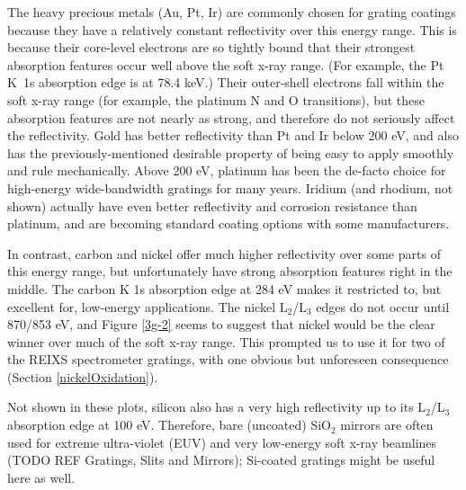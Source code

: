 The heavy precious metals (Au, Pt, Ir) are commonly chosen for grating coatings because they have a relatively constant reflectivity over this energy range.  This is because their core-level electrons are so tightly bound that their strongest absorption features occur well above the soft x-ray range.  (For example, the Pt K~1s absorption edge is at 78.4 keV.)  Their outer-shell electrons fall within the soft x-ray range (for example, the platinum N and O transitions), but these absorption features are not nearly as strong, and therefore do not seriously affect the reflectivity.  Gold has better reflectivity than Pt and Ir below 200 eV, and also has the previously-mentioned desirable property of being easy to apply smoothly and rule mechanically.  Above 200 eV, platinum has been the de-facto choice for high-energy wide-bandwidth gratings for many years.  Iridium (and rhodium, not shown) actually have even better reflectivity and corrosion resistance than platinum, and are becoming standard coating options with some manufacturers.

In contrast, carbon and nickel offer much higher reflectivity over some parts of this energy range, but unfortunately have strong absorption features right in the middle.  The carbon K 1s absorption edge at 284 eV makes it restricted to, but excellent for, low-energy applications.  The nickel L$_2$/L$_3$ edges do not occur until 870/853 eV, and Figure \ref{3g-2} seems to suggest that nickel would be the clear winner over much of the soft x-ray range.  This prompted us to use it for two of the REIXS spectrometer gratings, with one obvious but unforeseen consequence (Section \ref{nickelOxidation}).

Not shown in these plots, silicon also has a very high reflectivity up to its L$_2$/L$_3$ absorption edge at 100 eV. Therefore, bare (uncoated) SiO$_2$ mirrors are often used for extreme ultra-violet (EUV) and very low-energy soft x-ray beamlines (TODO REF Gratings, Slits and Mirrors); Si-coated gratings might be useful here as well.

